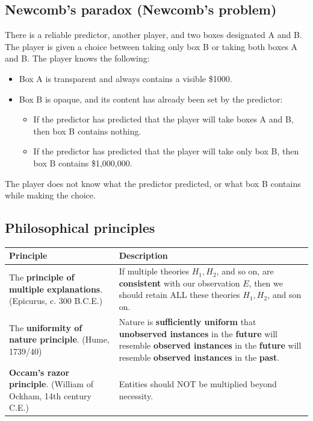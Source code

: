 \documentclass[11pt]{article}
\begin{document}
\subsection{Newcomb's paradox (Newcomb's problem)}
\label{sec:orga63f5d5}
There is a reliable predictor, another player, and two boxes designated A and B. The player is given a choice between taking only box B or taking both boxes A and B. The player knows the following:
\begin{itemize}
\item Box A is transparent and always contains a visible \$1000.
\item Box B is opaque, and its content has already been set by the predictor:
\begin{itemize}
\item If the predictor has predicted that the player will take boxes A and B, then box B contains nothing.
\item If the predictor has predicted that the player will take only box B, then box B contains \$1,000,000.
\end{itemize}
\end{itemize}

The player does not know what the predictor predicted, or what box B contains while making the choice.
\subsection{Philosophical principles}
\label{sec:org687dccc}
\begin{center}
\begin{tabularx}{\textwidth}{|X|X|}
\hline
Principle & Description\\
\hline
The \textbf{principle of multiple explanations}. (Epicurus, c. 300 B.C.E.) & If multiple theories \(H_1, H_2\), and so on, are \textbf{consistent} with our observation \(E\), then we should retain ALL these theories \(H_1, H_2\), and son on.\\
\hline
The \textbf{uniformity of nature principle}. (Hume, 1739/40) & Nature is \textbf{sufficiently uniform} that \textbf{unobserved instances} in the \textbf{future} will resemble \textbf{observed instances} in the \textbf{future} will resemble \textbf{observed instances} in the \textbf{past}.\\
\hline
\textbf{Occam's razor principle}. (William of Ockham, 14th century C.E.) & Entities should NOT be multiplied beyond necessity.\\
\hline
\end{tabularx}
\end{center}
 \newpage
\end{document}
